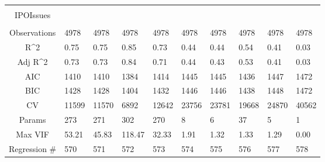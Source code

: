\documentclass{article}
\begin{document}
\begin{table}[H]
\begin{tabular}{|clllllllll|}
   &  &  &  &  &  &  &  &  &  \\ 
  IPOIssues &  &  &  &  &  &  &  &  &  \\ 
   &  &  &  &  &  &  &  &  &  \\ 
  \hline 
 Observations & 4978 & 4978 & 4978 & 4978 & 4978 & 4978 & 4978 & 4978 & 4978 \\ 
  R^2 & 0.75 & 0.75 & 0.85 & 0.73 & 0.44 & 0.44 & 0.54 & 0.41 & 0.03 \\ 
  Adj R^2 & 0.73 & 0.73 & 0.84 & 0.71 & 0.44 & 0.43 & 0.53 & 0.41 & 0.03 \\ 
  AIC & 1410 & 1410 & 1384 & 1414 & 1445 & 1445 & 1436 & 1447 & 1472 \\ 
  BIC & 1428 & 1428 & 1404 & 1432 & 1446 & 1446 & 1438 & 1448 & 1472 \\ 
  CV & 11599 & 11570 & 6892 & 12642 & 23756 & 23781 & 19668 & 24870 & 40562 \\ 
  Params & 273 & 271 & 302 & 270 & 8 & 6 & 37 & 5 & 1 \\ 
  Max VIF & 53.21 & 45.83 & 118.47 & 32.33 & 1.91 & 1.32 & 1.33 & 1.29 & 0.00 \\ 
  Regression \# & 570 & 571 & 572 & 573 & 574 & 575 & 576 & 577 & 578 \\ 
   \hline
\end{tabular}
 
\end{table}
\end{document}

